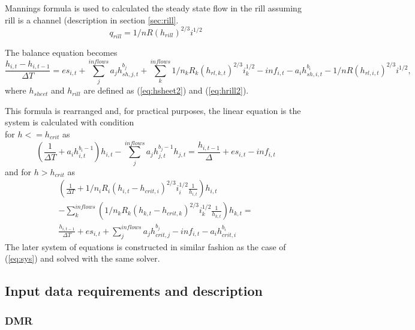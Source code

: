         Mannings formula is used to calculated the steady state flow in
        the rill assuming rill is a channel (description in section \ref{sec:rill}.  
        $$
        q_{rill} = 1/n R(h_{rill})^{2/3} i^{1/2}
        $$


        The balance equation becomes
        \begin{dmath}
          \frac{h_{i,t} - h_{i,t-1} }{\Delta T} = 
          es_{i,t} + \sum_j^{inflows} a_jh^{b_{j}}_{sh,j,t}  + \sum_k^{inflows} 1/n_k R_k(h_{rl,k,t})^{2/3} i_k^{1/2} - inf_{i,t} - a_ih^{b_{i}}_{sh,i,t} - 1/n R(h_{rl,i,t})^{2/3} i^{1/2},
        \end{dmath}
        where $h_{sheet}$ and $h_{rill}$ are defined as (\ref{eq:hsheet2}) and  (\ref{eq:hrill2}).

        This formula is rearranged and, for practical purposes, the linear equation is the system is calculated with condition \\
        for  $h<=h_{crit}$ as
        \begin{equation}
            \left(\frac{1}{\Delta T}+a_ih^{b_{i}-1}_{i,t}\right)h_{i,t} -  \sum_j^{inflows} a_jh^{b_{j}-1}_{j,t} h_{j,t} = \frac{h_{i,t-1}}{\Delta} +  es_{i,t} - inf_{i,t}
        \end{equation}
        and for  $h>h_{crit}$ as
        \begin{multline}
          \left(\frac{1}{\Delta T}
          + 1/n_i R_i(h_{i,t}-h_{crit,i})^{2/3} i_i^{1/2} \frac{1}{h_{i,t}}\right)h_{i,t} \\
            - \sum_k^{inflows} \left( 1/n_k R_k(h_{k,t}-h_{crit,k})^{2/3} i_k^{1/2}  \frac{1}{h_{k,t}}\right)h_{k,t}
          =  \\
          \frac{h_{i,t-1} }{\Delta T}
          + es_{i,t} 
          + \sum_j^{inflows} a_j h^{b_{j}}_{crit,j}  
          - inf_{i,t} 
          - a_i h^{b_{i}}_{crit,i} 
        \end{multline}
    The later system of equations is constructed in similar fashion as the case of (\ref{eq:sys}) and solved with the same solver.


    \FloatBarrier
    \subsection{Input data requirements and description}

        
        \subsubsection{DMR}
